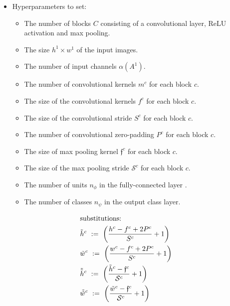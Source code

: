 \documentclass{article}
\begin{document}
\begin{itemize}
\item Hyperparameters to set:
\begin{itemize}
\item The number of blocks $C$ consisting of a convolutional layer, ReLU activation and max pooling.
\item The size $h^1 \times w^1$ of the input images.
\item The number of input channels $\alpha(A^1)$.
\item The number of convolutional kernels $m^c$ for each block $c$.
\item The size of the convolutional kernels $f^c$ for each block $c$.
\item The size of the convolutional stride $S^c$ for each block $c$.
\item The number of convolutional zero-padding $P^c$ for each block $c$.
\item The size of max pooling kernel $\mathfrak{f}^c$ for each block $c$.
\item The size of the max pooling stride $\mathcal{S}^c$ for each block $c$.
\item The number of units $n_\phi$ in the fully-connected layer .
\item The number of classes $n_\psi$ in the output class layer.
\end{itemize}
\end{itemize}

\begin{align}
& \text{substitutions:} \notag \\
& \tilde{h}^c \ := \  \left( \frac{h^c - f^c +2P^c}{S^c}+1 \right) \label{73}\\
& \tilde{w}^c \ := \  \left( \frac{w^c - f^c +2P^c}{S^c}+1 \right) \label{74}\\
& \tilde{\tilde{h}}^c \ := \  \left( \frac{\tilde{h}^c - \mathfrak{f}^c }{\mathcal{S}^c}+1 \right) \label{75}\\
& \tilde{\tilde{w}}^c \ := \  \left( \frac{\tilde{w}^c - \mathfrak{f}^c}{\mathcal{S}^c}+1 \right)  \label{76}
\end{align}
\end{document}
